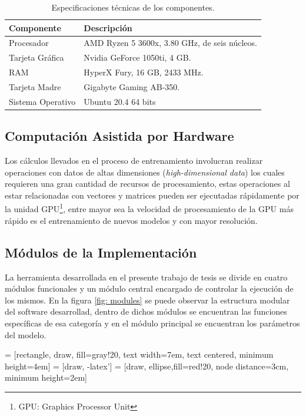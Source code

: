 \begin{table}[H]
    \centering
    \caption{Especificaciones técnicas de los componentes.}
    \begin{tabular}{|l|l|}
        \hline
        \bf{Componente} & \bf{Descripción} \\
        \hline
        Procesador & AMD Ryzen 5 3600x, 3.80 GHz, de seis núcleos.\\
        \hline
        Tarjeta Gráfica & Nvidia GeForce 1050ti, 4 GB. \\
        \hline
        RAM & HyperX Fury, 16 GB, 2433 MHz. \\
        \hline
        Tarjeta Madre & Gigabyte Gaming AB-350. \\
        \hline
        Sistema Operativo & Ubuntu 20.4 64 bits \\
        \hline
    \end{tabular}
    \label{tab:specs}
\end{table}

\subsection{Computación Asistida por Hardware}
Los cálculos llevados en el proceso de entrenamiento involucran realizar operaciones con datos de altas dimensiones (\emph{high-dimensional data}) los cuales requieren una gran cantidad de recursos de procesamiento, estas operaciones al estar relacionadas con vectores y matrices pueden ser ejecutadas rápidamente por la unidad GPU\footnote{GPU: Graphics Processor Unit}, entre mayor sea la velocidad de procesamiento de la GPU más rápido es el entrenamiento de nuevos modelos y con mayor resolución.

\subsection{Módulos de la Implementación}
La herramienta desarrollada en el presente trabajo de tesis se divide en cuatro módulos funcionales y un módulo central encargado de controlar la ejecución de los mismos. En la figura \ref{fig: modules} se puede observar la estructura modular del software desarrollad, dentro de dichos módulos se encuentran las funciones específicas de esa categoría y en el módulo principal se encuentran los parámetros del modelo.

 = [rectangle, draw, fill=gray!20, 
    text width=7em, text centered, minimum height=4em]
 = [draw, -latex']
 = [draw, ellipse,fill=red!20, node distance=3cm,
    minimum height=2em]

